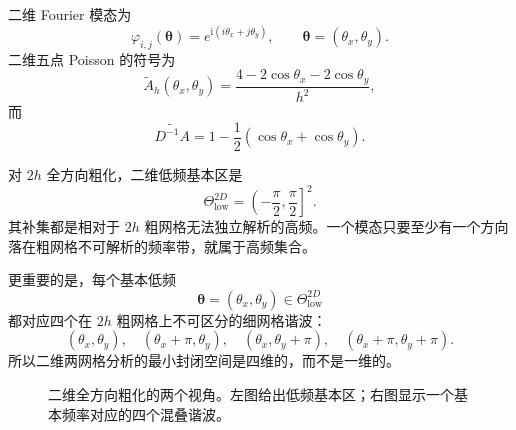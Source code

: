 二维 Fourier 模态为
\begin{equation}
\varphi_{i,j}(\bm\theta)
=
e^{\mathrm i(i\theta_x+j\theta_y)},
\qquad
\bm\theta=(\theta_x,\theta_y).
\end{equation}
二维五点 Poisson 的符号为
\begin{equation}
\widetilde A_h(\theta_x,\theta_y)
=
\frac{4-2\cos\theta_x-2\cos\theta_y}{h^2},
\end{equation}
而
\begin{equation}
\widetilde{D^{-1}A}
=
1-\frac12(\cos\theta_x+\cos\theta_y).
\label{eq:lfa-2d-dinv-a}
\end{equation}

对 $2h$ 全方向粗化，二维低频基本区是
\begin{equation}
\Theta_{\mathrm{low}}^{2D}
=
\left(-\frac\pi2,\frac\pi2\right]^2.
\label{eq:lfa-2d-low-region}
\end{equation}
其补集都是相对于 $2h$ 粗网格无法独立解析的高频。一个模态只要至少有一个方向落在粗网格不可解析的频率带，就属于高频集合。

更重要的是，每个基本低频
\begin{equation}
\bm\theta=(\theta_x,\theta_y)
\in\Theta_{\mathrm{low}}^{2D}
\end{equation}
都对应四个在 $2h$ 粗网格上不可区分的细网格谐波：
\begin{equation}
\boxed{
(\theta_x,\theta_y),\quad
(\theta_x+\pi,\theta_y),\quad
(\theta_x,\theta_y+\pi),\quad
(\theta_x+\pi,\theta_y+\pi).
}
\label{eq:lfa-two-dimensional-harmonics}
\end{equation}
所以二维两网格分析的最小封闭空间是四维的，而不是一维的。

\begin{figure}[htbp]
\centering
{}
\caption{二维全方向粗化的两个视角。左图给出低频基本区；右图显示一个基本频率对应的四个混叠谐波。}
\label{fig:lfa-2d-region-and-harmonics}
\label{fig:lfa-2d-frequency-region}
\end{figure}

